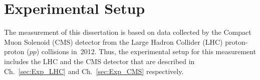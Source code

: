 \chapter{Experimental Setup} %
\label{sec:Exp}

The measurement of this dissertation is based on data collected by the Compact Muon Solenoid (CMS) detector from the Large Hadron Collider (LHC) proton-proton ($pp$) collisions in~2012. Thus, the experimental setup for this measurement includes the LHC and the CMS detector that are described in Ch.~\ref{sec:Exp_LHC} and Ch.~\ref{sec:Exp_CMS} respectively. 

